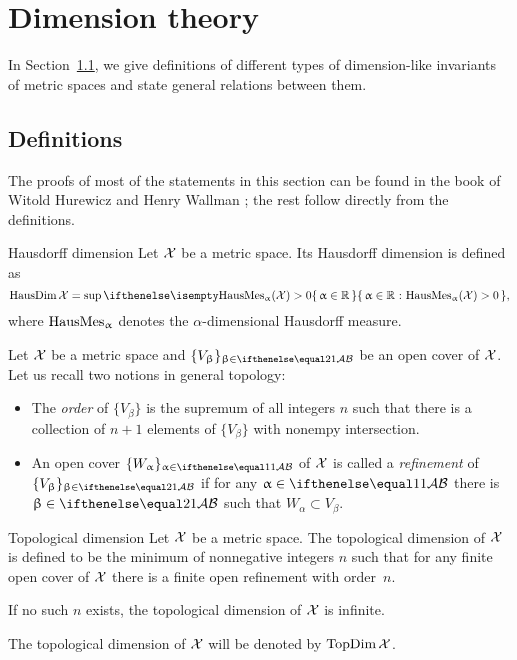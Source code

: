 \chapter{Dimension theory}\label{ch:dim}

In Section~\ref{sec:prelim:dim}, we give definitions of different types of dimension-like invariants of metric spaces and state general relations between them.


\section{Definitions}\label{sec:prelim:dim}

The proofs of most of the statements in this section can be found in the book of Witold Hurewicz and Henry Wallman \cite{hurewicz-wallman}; 
the rest follow directly from the definitions.

\begin{thm}{Hausdorff dimension}
\label{def:HausDim}
Let $\mathcal{X}$ be a metric space. 
Its Hausdorff dimension is defined as
\[\HausDim\spc{X}=\sup\set{\alpha\in\RR}{\HausMes_\alpha(\spc{X})>0},\]
 where $\mathop{\rm HausMes}\nolimits_\upalpha$ denotes the $\alpha$-dimensional Hausdorff measure. %
\end{thm}

Let $\mathcal{X}$ be a metric space and $\{V_\beta\}_{\beta\in\IndexSet[2]}$
 be an open cover of $\mathcal{X}$.
Let us recall two notions in general topology:
\begin{itemize}

\item The \emph{order} of $\{V_\beta\}$ is the supremum of all integers $n$ such that there is a collection of $n+1$ elements of $\{V_\beta\}$ with nonempy intersection.

\item An open cover $\{W_\alpha\}_{\alpha\in\IndexSet}$ of $\mathcal{X}$ is called a \emph{refinement} of  $\{V_\beta\}_{\beta\in\IndexSet[2]}$ if for any $\alpha\in\IndexSet$ there is $\beta\in\IndexSet[2]$ such that $W_\alpha\subset V_\beta$.

\end{itemize}

\begin{thm}{Topological dimension}
\label{def:TopDim}
Let $\mathcal{X}$ be a metric space. 
The topological dimension of $\mathcal{X}$ is defined to be the minimum of nonnegative integers $n$ 
such that for any finite open cover of $\mathcal{X}$ there is a finite open refinement with order~$n$.

If no such $n$ exists, the topological dimension of $\mathcal{X}$ is infinite.

The topological dimension of $\mathcal{X}$ will be denoted by $\mathop{\rm TopDim}\nolimits\mathcal{X}$.
\end{thm}

